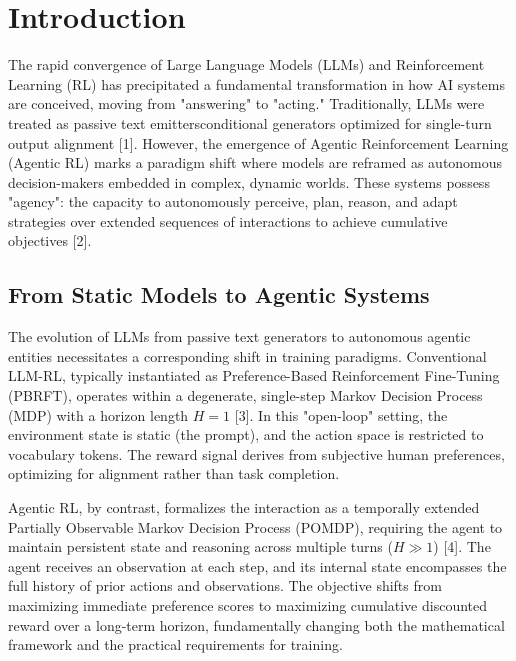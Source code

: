 
\section{ Introduction}

The rapid convergence of Large Language Models (LLMs) and Reinforcement Learning (RL) has precipitated a fundamental transformation in how AI systems are conceived, moving from "answering" to "acting." Traditionally, LLMs were treated as passive text emittersconditional generators optimized for single-turn output alignment [1]. However, the emergence of Agentic Reinforcement Learning (Agentic RL) marks a paradigm shift where models are reframed as autonomous decision-makers embedded in complex, dynamic worlds. These systems possess "agency": the capacity to autonomously perceive, plan, reason, and adapt strategies over extended sequences of interactions to achieve cumulative objectives [2].

\subsection{From Static Models to Agentic Systems}

The evolution of LLMs from passive text generators to autonomous agentic entities necessitates a corresponding shift in training paradigms. Conventional LLM-RL, typically instantiated as Preference-Based Reinforcement Fine-Tuning (PBRFT), operates within a degenerate, single-step Markov Decision Process (MDP) with a horizon length $H=1$ [3]. In this "open-loop" setting, the environment state is static (the prompt), and the action space is restricted to vocabulary tokens. The reward signal derives from subjective human preferences, optimizing for alignment rather than task completion.

Agentic RL, by contrast, formalizes the interaction as a temporally extended Partially Observable Markov Decision Process (POMDP), requiring the agent to maintain persistent state and reasoning across multiple turns ($H \gg 1$) [4]. The agent receives an observation at each step, and its internal state encompasses the full history of prior actions and observations. The objective shifts from maximizing immediate preference scores to maximizing cumulative discounted reward over a long-term horizon, fundamentally changing both the mathematical framework and the practical requirements for training.

